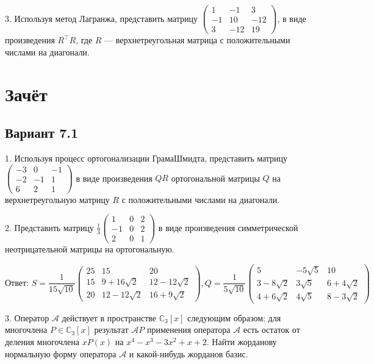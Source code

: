 \documentclass[a4paper]{article}
\begin{document}
3. Используя метод Лагранжа, представить матрицу $\left(
\begin{array}{rrr}
1 & -1 & 3 \\
-1 & 10 & -12 \\
3 & -12 & 19
\end{array}
\right)$, в виде произведения $R^\top R$, где $R$ ---
верхнетреугольная матрица с положительными числами на диагонали.

\section{Зачёт }

\subsection{Вариант 7.1}

1. Используя процесс ортогонализации Грама\ч Шмидта, представить
мат\-ри\-цу $\left(
\begin{array}{rrr}
-3 & 0 & -1 \\
-2 & -1 & 1 \\
6 & 2 & 1
\end{array}
\right) $ в виде произведения $QR$ ортогональной матрицы $Q$ на
верхнетреугольную матрицу $R$ с положительными числами на
диагонали.

2. Представить матрицу $\displaystyle\frac{1}{3}\left(
\begin{array}{rrr}
1 & 0 & 2 \\
-1 & 0 & 2 \\
2 & 0 & 1
\end{array}\right)
$ в виде произведения симметрической неотрицательной матрицы на
ортогональную.

$$
\textit{Ответ:\ } S=\displaystyle\frac{1}{15\sqrt{10}} \left(
\begin{array}{ccc}
25 & 15 & 20 \\
15 & 9+16\sqrt 2 & 12-12\sqrt 2 \\
20 & 12-12\sqrt 2 & 16+9\sqrt 2
\end{array}
\right), Q=\displaystyle\frac{1}{5\sqrt{10}}\left(
\begin{array}{ccc}
5 & -5\sqrt 5 & 10 \\
3-8\sqrt 2 & 3\sqrt 5 & 6+4\sqrt 2 \\
4+6\sqrt 2 & 4\sqrt 5 & 8-3\sqrt 2
\end{array}
\right)
$$

3. Оператор $\mathcal{A}$ действует в пространстве
$\mathbb{C}_3[x]$ следующим образом: для многочлена
$P\in\mathbb{C}_3[x]$ результат $\mathcal{A}P$ применения
оператора $\mathcal{A}$ есть остаток от деления многочлена $xP(x)$
на $x^4-x^3-3x^2+x+2$. Найти жорданову нормальную форму оператора
$\mathcal{A}$ и какой-нибудь жорданов базис.
\end{document}
